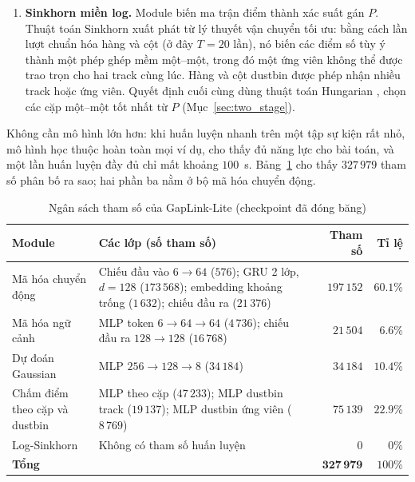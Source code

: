 \begin{enumerate}
    \item \textbf{Sinkhorn miền log.} Module biến ma trận điểm thành xác suất gán $P$. Thuật toán Sinkhorn \cite{sinkhorn1967,cuturi2013sinkhorn} xuất phát từ lý thuyết vận chuyển tối ưu: bằng cách lần lượt chuẩn hóa hàng và cột (ở đây $T=20$ lần), nó biến các điểm số tùy ý thành một phép ghép mềm một--một, trong đó một ứng viên không thể được trao trọn cho hai track cùng lúc. Hàng và cột dustbin được phép nhận nhiều track hoặc ứng viên. Quyết định cuối cùng dùng thuật toán Hungarian \cite{kuhn1955hungarian}, chọn các cặp một--một tốt nhất từ $P$ (Mục~\ref{sec:two_stage}).
\end{enumerate}
Không cần mô hình lớn hơn: khi huấn luyện nhanh trên một tập sự kiện rất nhỏ, mô hình học thuộc hoàn toàn mọi ví dụ, cho thấy đủ năng lực cho bài toán, và một lần huấn luyện đầy đủ chỉ mất khoảng $100$~s. Bảng~\ref{tab:param_breakdown} cho thấy $327\,979$ tham số phân bố ra sao; hai phần ba nằm ở bộ mã hóa chuyển động.

\begin{table}[H]
    \centering
    \caption{Ngân sách tham số của GapLink-Lite (checkpoint đã đóng băng)}
    \label{tab:param_breakdown}
    \small
    \begin{tabularx}{\textwidth}{l X r r}
        \toprule
        \textbf{Module} & \textbf{Các lớp (số tham số)} & \textbf{Tham số} & \textbf{Tỉ lệ} \\
        \midrule
        Mã hóa chuyển động & Chiếu đầu vào $6\!\to\!64$ ($576$); GRU 2 lớp, $d=128$ ($173\,568$); embedding khoảng trống ($1\,632$); chiếu đầu ra ($21\,376$) & $197\,152$ & $60.1\%$ \\
        Mã hóa ngữ cảnh & MLP token $6\!\to\!64\!\to\!64$ ($4\,736$); chiếu đầu ra $128\!\to\!128$ ($16\,768$) & $21\,504$ & $6.6\%$ \\
        Dự đoán Gaussian & MLP $256\!\to\!128\!\to\!8$ ($34\,184$) & $34\,184$ & $10.4\%$ \\
        Chấm điểm theo cặp và dustbin & MLP theo cặp ($47\,233$); MLP dustbin track ($19\,137$); MLP dustbin ứng viên ($8\,769$) & $75\,139$ & $22.9\%$ \\
        Log-Sinkhorn & Không có tham số huấn luyện & $0$ & $0\%$ \\
        \midrule
        \textbf{Tổng} & & $\mathbf{327\,979}$ & $100\%$ \\
        \bottomrule
    \end{tabularx}
\end{table}

